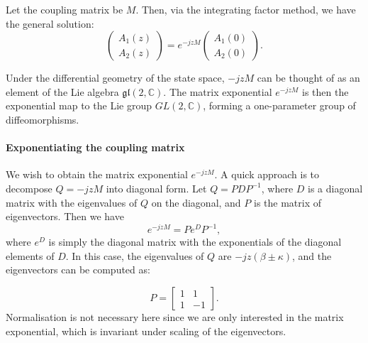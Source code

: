 \documentclass[10pt, a4paper]{article}
\begin{document}
Let the coupling matrix be $M$.
Then, via the integrating factor method, we have the general solution:
\begin{equation}
\begin{pmatrix}
A_1(z)\\
A_2(z)
\end{pmatrix}
=e^{-jzM}
\begin{pmatrix}
A_1(0)\\
A_2(0)
\end{pmatrix}.
\end{equation}

Under the differential geometry of the state space,
$-jzM$ can be thought of as an element of the Lie algebra $\mathfrak{gl}(2,\mathbb{C})$.
The matrix exponential $e^{-jzM}$ is then the exponential map to the Lie group $GL(2,\mathbb{C})$, forming a one-parameter group of diffeomorphisms.

\paragraph{Exponentiating the coupling matrix} We wish to obtain the matrix exponential $e^{-jzM}$.
A quick approach is to decompose $Q=-jzM$ into diagonal form.
Let $Q = PDP^{-1}$, where $D$ is a diagonal matrix with the eigenvalues of $Q$ on the diagonal, and $P$ is the matrix of eigenvectors.
Then we have
\begin{equation}
    e^{-jzM} = Pe^{D}P^{-1},
\end{equation}
where $e^{D}$ is simply the diagonal matrix with the exponentials of the diagonal elements of $D$.
In this case, the eigenvalues of $Q$ are $-jz(\beta \pm \kappa)$, and the eigenvectors can be computed as:

\begin{equation}
P = \begin{bmatrix}
1 & 1 \\
1 & -1
\end{bmatrix}.
\end{equation}
Normalisation is not necessary here since we are only interested in the matrix exponential, which is invariant under scaling of the eigenvectors.
\end{document}
